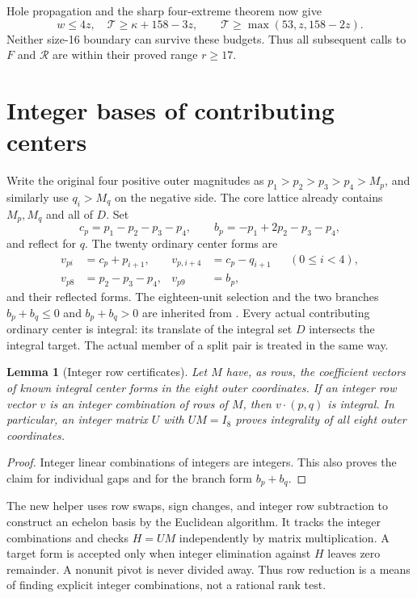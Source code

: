 \documentclass[11pt,a4paper]{article}
\newcommand{\T}{\mathcal T}
\newtheorem{lemma}[theorem]{Lemma}
\begin{document}
Hole propagation and the sharp four-extreme theorem now give
\begin{equation}\label{peeling}
 w\le4z,\quad \T\ge\kappa+158-3z,
 \qquad\T\ge\max(53,z,158-2z).
\end{equation}
Neither size-16 boundary can survive these budgets. Thus all subsequent
calls to $F$ and $\mathcal R$ are within their proved range $r\ge17$.

\section{Integer bases of contributing centers}
Write the original four positive outer magnitudes as
$p_1>p_2>p_3>p_4>M_p$, and similarly use $q_i>M_q$ on the negative
side. The core lattice already contains $M_p,M_q$ and all of $D$.
Set
\[
 c_p=p_1-p_2-p_3-p_4,\qquad
 b_p=-p_1+2p_2-p_3-p_4,
\]
and reflect for $q$. The twenty ordinary center forms are
\begin{align*}
 v_{pi}&=c_p+p_{i+1},&v_{p,i+4}&=c_p-q_{i+1}&&(0\le i<4),\\
 v_{p8}&=p_2-p_3-p_4,&v_{p9}&=b_p,
\end{align*}
and their reflected forms. The eighteen-unit selection and the two
branches $b_p+b_q\le0$ and $b_p+b_q>0$ are inherited from
\cite{overlap,previous}. Every actual contributing ordinary center is
integral: its translate of the integral set $D$ intersects the integral
target. The actual member of a split pair is treated in the same way.

\begin{lemma}[Integer row certificates]\label{integerbasis}
Let $M$ have, as rows, the coefficient vectors of known integral center
forms in the eight outer coordinates. If an integer row vector $v$ is
an integer combination of rows of $M$, then $v\cdot(p,q)$ is integral.
In particular, an integer matrix $U$ with $UM=I_8$ proves integrality
of all eight outer coordinates.
\end{lemma}
\begin{proof}
Integer linear combinations of integers are integers. This also proves
the claim for individual gaps and for the branch form $b_p+b_q$.
\end{proof}
The new helper  uses row swaps,
sign changes, and integer row subtraction to construct an echelon
basis by the Euclidean algorithm. It tracks the integer combinations
and checks $H=UM$ independently by matrix multiplication. A target
form is accepted only when integer elimination against $H$ leaves zero
remainder. A nonunit pivot is never divided away. Thus row reduction
is a means of finding explicit integer combinations, not a rational
rank test.
\end{document}
